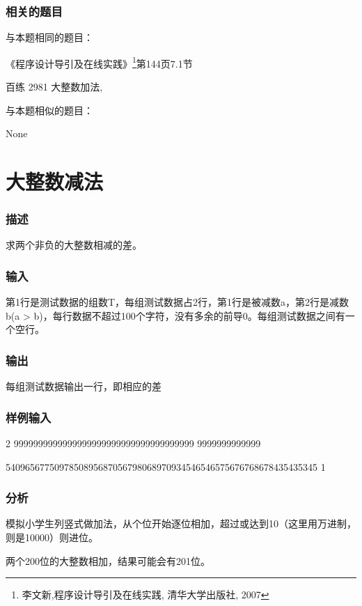 \subsubsection{相关的题目}
与本题相同的题目：
\begindot
\item 《程序设计导引及在线实践》\footnote{李文新,程序设计导引及在线实践, 清华大学出版社, 2007}第144页7.1节
\item 百练 2981 大整数加法, 
\myenddot

与本题相似的题目：
\begindot
\item  None
\myenddot


\section{大整数减法} %
\subsubsection{描述}
求两个非负的大整数相减的差。

\subsubsection{输入}
第1行是测试数据的组数T，每组测试数据占2行，第1行是被减数a，第2行是减数b(a > b)，每行数据不超过100个字符，没有多余的前导0。每组测试数据之间有一个空行。

\subsubsection{输出}
每组测试数据输出一行，即相应的差

\subsubsection{样例输入}
\begin{Code}
2
9999999999999999999999999999999999999
9999999999999

5409656775097850895687056798068970934546546575676768678435435345
1
\end{Code}

\subsubsection{分析}
模拟小学生列竖式做加法，从个位开始逐位相加，超过或达到10（这里用万进制，则是10000）则进位。

两个200位的大整数相加，结果可能会有201位。

